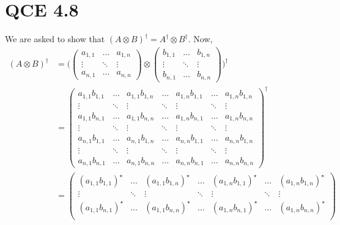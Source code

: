 \documentclass[10pt]{article}
\begin{document}
\section*{QCE 4.8}
We are asked to show that $(A \otimes B)^{\dag} = A^{\dag} \otimes B^{\dag}$. Now,
\begin{align*}
(A \otimes B)^{\dag} &=
\Bigg(
\begin{pmatrix}
a_{1, 1} & \dots & a_{1, n} \\
\vdots & \ddots & \vdots \\
a_{n, 1} & \dots & a_{n, n}
\end{pmatrix}
\otimes
\begin{pmatrix}
b_{1, 1} & \dots & b_{1, n} \\
\vdots & \ddots & \vdots \\
b_{n, 1} & \dots & b_{n, n}
\end{pmatrix}
\Bigg)^{\dag} \\
 &= 
 \begin{pmatrix}
 a_{1, 1} b_{1, 1} & \dots   & a_{1, 1} b_{1, n} & \dots   & a_{1, n} b_{1, 1} & \dots    & a_{1, n} b_{1, n} \\
 \vdots               & \ddots & \vdots               & \ddots &  \vdots              & \ddots  & \vdots \\
 a_{1, 1} b_{n, 1} & \dots   & a_{1, 1} b_{n, n} & \dots   & a_{1, n} b_{n, 1} & \dots    & a_{1, n} b_{n, n} \\
 \vdots               & \ddots &  \vdots              & \ddots & \vdots               & \ddots & \vdots \\
 a_{n, 1} b_{1, 1} & \dots   & a_{n, 1} b_{1, n} & \dots   & a_{n, n} b_{1, 1} & \dots    & a_{n, n} b_{1, n} \\
 \vdots               & \ddots & \vdots               & \ddots & \vdots               & \ddots  & \vdots \\
 a_{n, 1} b_{n, 1} & \dots   & a_{n, 1} b_{n, n} & \dots   & a_{n, n} b_{n, 1} & \dots    & a_{n, n} b_{n, n}
 \end{pmatrix}^{\dag} \\
 &= \begin{pmatrix}
 (a_{1, 1} b_{1, 1})^{\star} & \dots   & (a_{1, 1} b_{1, n})^{\star} & \dots   & (a_{1, n} b_{1, 1})^{\star} & \dots    & (a_{1, n} b_{1, n})^{\star} \\
 \vdots                            & \ddots & \vdots                             & \ddots &  \vdots                            & \ddots  & \vdots \\
 (a_{1, 1} b_{n, 1})^{\star} & \dots   & (a_{1, 1} b_{n, n})^{\star} & \dots   & (a_{1, n} b_{n, 1})^{\star} & \dots    & (a_{1, n} b_{n, n})^{\star} \\

\end{pmatrix}
\end{align*}
\end{document}

